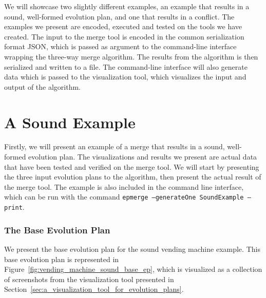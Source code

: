 \documentclass[a4paper,english]{ifimaster}
\begin{document}
We will showcase two slightly different examples, an example that results in a sound, well-formed evolution plan, and one that results in a conflict. The examples we present are encoded, executed and tested on the tools we have created. The input to the merge tool is encoded in the common serialization format JSON, which is passed as argument to the command-line interface wrapping the three-way merge algorithm. The results from the algorithm is then serialized and written to a file. The command-line interface will also generate data which is passed to the visualization tool, which visualizes the input and output of the algorithm.

\section{A Sound Example}%
\label{sec:a_sound_example}

Firstly, we will present an example of a merge that results in a sound, well-formed evolution plan. The visualizations and results we present are actual data that have been tested and verified on the merge tool. We will start by presenting the three input evolution plans to the algorithm, then present the actual result of the merge tool. The example is also included in the command line interface, which can be run with the command \texttt{epmerge --generateOne SoundExample --print}.

\subsubsection{The Base Evolution Plan}%

We present the base evolution plan for the sound vending machine example. This base evolution plan is represented in Figure~\vref{fig:vending_machine_sound_base_ep}, which is visualized as a collection of screenshots from the visualization tool presented in Section~\vref{sec:a_visualization_tool_for_evolution_plans}.
\end{document}
